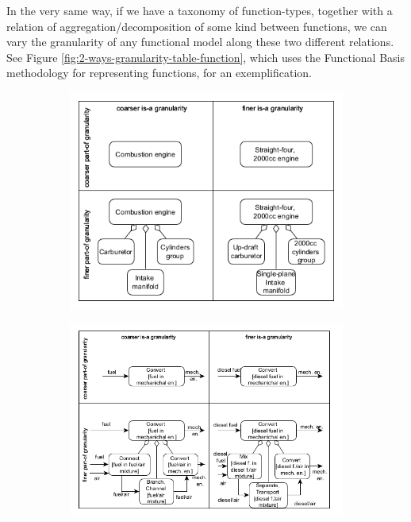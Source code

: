 \documentclass[
]{ceurart}
\begin{document}
In the very same way, if we have a taxonomy of function-types, together with a relation of aggregation/decomposition of some kind between functions, we can vary the granularity of any functional model along these two different relations. See Figure \ref{fig:2-ways-granularity-table-function}, which uses the Functional Basis methodology for representing functions, for an exemplification.

\begin{figure}
    \centering
    \begin{subfigure}{0.40\textwidth}
    \includegraphics[width=\textwidth]{2-ways-granularity-table-new-new.PNG}
    \caption{}
    \label{fig:2-ways-granularity-table-new-new}
    \end{subfigure}
    \hfill
    \begin{subfigure}{0.40\textwidth}
    \includegraphics[width=\textwidth]{2-ways-granularity-table-functions.png}

\end{subfigure}
\end{figure}
\end{document}
